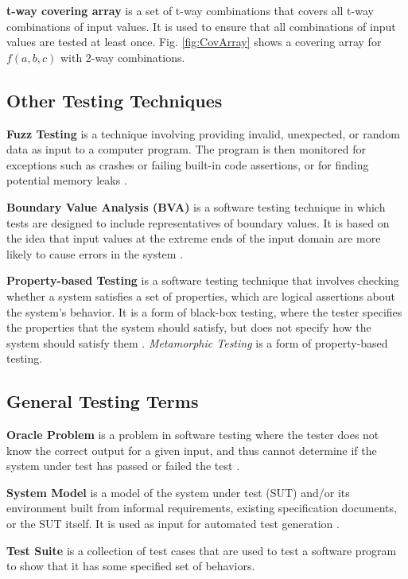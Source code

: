 \textbf{t-way covering array} is a set of t-way combinations that covers all t-way combinations of input values.
It is used to ensure that all combinations of input values are tested at least once.
Fig. \ref{fig:CovArray} shows a covering array for $f(a, b, c)$ with 2-way combinations.

\subsection{Other Testing Techniques}\label{subsec:other-testing-techniques}

\textbf{Fuzz Testing} is a technique involving providing invalid, unexpected, or random data as input to a computer program.
The program is then monitored for exceptions such as crashes or failing built-in code assertions, or for finding potential memory leaks \cite{Fuzz}.

\textbf{Boundary Value Analysis (BVA)} is a software testing technique in which tests are designed to include representatives of boundary values.
It is based on the idea that input values at the extreme ends of the input domain are more likely to cause errors in the system \cite{BVA}.

\textbf{Property-based Testing} is a software testing technique that involves checking whether a system satisfies a set of properties, which are logical assertions about the system's behavior.
It is a form of black-box testing, where the tester specifies the properties that the system should satisfy, but does not specify how the system should satisfy them \cite{Hypothesis}. \textit{Metamorphic Testing} is a form of property-based testing.

\subsection{General Testing Terms}\label{subsec:general-testing-terms}

\textbf{Oracle Problem} is a problem in software testing where the tester does not know the correct output for a given input, and thus cannot determine if the system under test has passed or failed the test \cite{FELDERER20161}.

\textbf{System Model} is a model of the system under test (SUT) and/or its environment built from informal requirements, existing specification documents, or the SUT itself.
It is used as input for automated test generation \cite{FELDERER20161}.

\textbf{Test Suite} is a collection of test cases that are used to test a software program to show that it has some specified set of behaviors.

